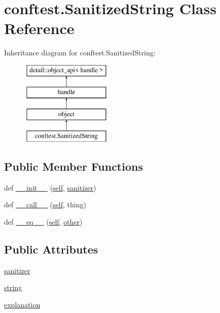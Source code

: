 \hypertarget{classconftest_1_1_sanitized_string}{}\section{conftest.\+Sanitized\+String Class Reference}
\label{classconftest_1_1_sanitized_string}
Inheritance diagram for conftest.\+Sanitized\+String\+:\begin{figure}[H]
\begin{center}
\leavevmode
\includegraphics[height=4.000000cm]{classconftest_1_1_sanitized_string}
\end{center}
\end{figure}
\subsection*{Public Member Functions}
\begin{DoxyCompactItemize}
\item 
def \mbox{\hyperlink{classconftest_1_1_sanitized_string_ab8b64ff1702e12ec99b0b7492ff272d3}{\+\_\+\+\_\+init\+\_\+\+\_\+}} (\mbox{\hyperlink{modsupport_8h_a0180ca1808366e5da641475e8bf8cca3}{self}}, \mbox{\hyperlink{classconftest_1_1_sanitized_string_a255c61966d13208bffeee9547d87b2e3}{sanitizer}})
\item 
def \mbox{\hyperlink{classconftest_1_1_sanitized_string_a9a816c5296071584d850bcffecf4aab9}{\+\_\+\+\_\+call\+\_\+\+\_\+}} (\mbox{\hyperlink{modsupport_8h_a0180ca1808366e5da641475e8bf8cca3}{self}}, thing)
\item 
def \mbox{\hyperlink{classconftest_1_1_sanitized_string_af547164326b203742c8e56cd4f499c69}{\+\_\+\+\_\+eq\+\_\+\+\_\+}} (\mbox{\hyperlink{modsupport_8h_a0180ca1808366e5da641475e8bf8cca3}{self}}, \mbox{\hyperlink{dictobject_8h_abd4733e17e86acb453bda62bc8b96adf}{other}})
\end{DoxyCompactItemize}
\subsection*{Public Attributes}
\begin{DoxyCompactItemize}
\item 
\mbox{\hyperlink{classconftest_1_1_sanitized_string_a255c61966d13208bffeee9547d87b2e3}{sanitizer}}
\item 
\mbox{\hyperlink{classconftest_1_1_sanitized_string_af71c192b9f0d0cb02747c08235931897}{string}}
\item 
\mbox{\hyperlink{classconftest_1_1_sanitized_string_a5088218f27599cac6d008378f8d4215a}{explanation}}
\end{DoxyCompactItemize}
